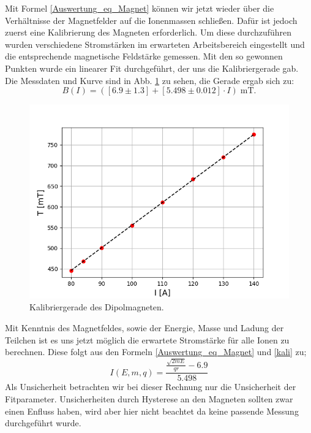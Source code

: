 Mit Formel \ref{Auswertung_eq_Magnet} können wir jetzt wieder über die Verhältnisse der Magnetfelder auf die Ionenmassen schließen.
Dafür ist jedoch zuerst eine Kalibrierung des Magneten erforderlich.
Um diese durchzuführen wurden verschiedene Stromstärken im erwarteten Arbeitsbereich eingestellt und die entsprechende magnetische Feldstärke gemessen.
Mit den so gewonnen Punkten wurde ein linearer Fit durchgeführt, der uns die Kalibriergerade gab.
Die Messdaten und Kurve sind in Abb. \ref{Magnet_kali} zu sehen, die Gerade ergab sich zu:
\begin{equation}
B(I) = ( [\num{6.9} \pm \num{1.3}] + [\num{5.498} \pm \num{0.012}] \cdot I ) \; \si{\milli\tesla}.
\label{kali}
\end{equation}

\begin{figure}[ht]
  \centering
  \includegraphics[width=0.95\linewidth]{Pictures/magnet.png}
  \caption{Kalibriergerade des Dipolmagneten.}
  \label{Magnet_kali}
\end{figure}

Mit Kenntnis des Magnetfeldes, sowie der Energie, Masse und Ladung der Teilchen ist es uns jetzt möglich die erwartete Stromstärke für alle Ionen zu berechnen.
Diese folgt aus den Formeln \ref{Auswertung_eq_Magnet} und \ref{kali} zu;
\begin{equation}
I(E, m, q) = \frac{\frac{{\sqrt{2mE}}}{qr}-\num{6.9}}{\num{5.498}}
\label{HE_ion}
\end{equation}
Als Unsicherheit betrachten wir bei dieser Rechnung nur die Unsicherheit der Fitparameter.
Unsicherheiten durch Hysterese an den Magneten sollten zwar einen Enfluss haben, wird aber hier nicht beachtet da keine passende Messung durchgeführt wurde.

